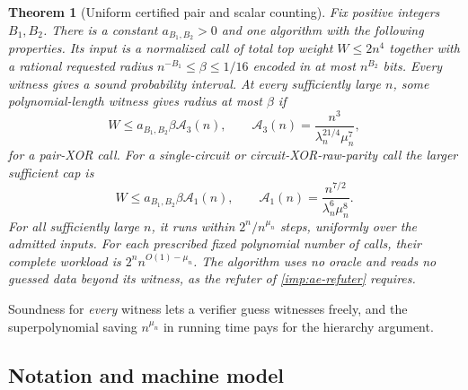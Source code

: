 \documentclass[11pt,letterpaper]{article}
\newtheorem{theorem}{Theorem}[section]
\theoremstyle{definition}
\theoremstyle{remark}
\begin{document}
\begin{theorem}[Uniform certified pair and scalar counting]
\label{thm:pair-uniform}\label{thm:counting}
Fix positive integers \(B_1,B_2\). There is a constant
\(a_{B_1,B_2}>0\) and one algorithm with the following properties. Its
input is a normalized call of total top weight \(W\le2n^4\) together
with a rational requested radius \(n^{-B_1}\le\beta\le1/16\) encoded in
at most \(n^{B_2}\) bits.
Every witness gives a sound probability interval. At every
sufficiently large \(n\), some polynomial-length witness gives radius
at most \(\beta\) if
\[
 W\le a_{B_1,B_2}\beta\mathcal A_3(n),\qquad
 \mathcal A_3(n)=\frac{n^3}{\lambda_n^{21/4}\mu_n^7},
\]
for a pair-XOR call. For a single-circuit or circuit-XOR-raw-parity
call the larger sufficient cap is
\[
 W\le a_{B_1,B_2}\beta\mathcal A_1(n),\qquad
 \mathcal A_1(n)=\frac{n^{7/2}}{\lambda_n^6\mu_n^8}.
\]
For all sufficiently large \(n\), it runs within \(2^n/n^{\mu_n}\) steps,
uniformly over the admitted inputs.
For each prescribed fixed polynomial number of calls, their complete
workload is \(2^n n^{O(1)-\mu_n}\). The algorithm uses no oracle and
reads no guessed data beyond its witness, as the refuter of
\cref{imp:ae-refuter} requires.
\end{theorem}

Soundness for \emph{every} witness lets a verifier guess witnesses
freely, and the superpolynomial saving \(n^{\mu_n}\) in running time pays
for the hierarchy argument.

\subsection{Notation and machine model}
\end{document}
